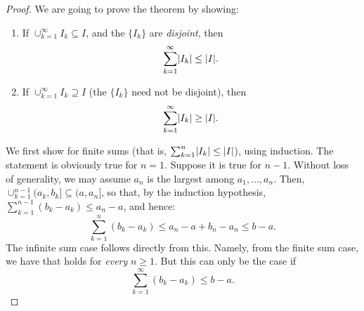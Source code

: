 \begin{proof}
	We are going to prove the theorem by showing:
	\begin{enumerate}
		\item If \(\cup_{k=1}^\infty I_k \subseteq I\), and the \(\{I_k\}\) are \textit{disjoint}, then
		      \begin{equation}
			      \sum_{k=1}^\infty \lvert I_k\rvert \le \lvert I\rvert.
			      \label{eq:IntervalSub}
		      \end{equation}
		\item If \(\cup_{k=1}^\infty I_k \supseteq I\) (the \(\{I_k\}\) need not be disjoint), then
		      \begin{equation}
			      \sum_{k=1}^\infty \lvert I_k\rvert \ge \lvert I\rvert.
			      \label{eq:IntervalSuper}
		      \end{equation}
	\end{enumerate}

	We first show  for finite sums (that is, \(\sum_{k=1}^n \lvert I_k\rvert \le \lvert I\rvert\)), using induction. The statement is obviously true for \(n=1\). Suppose it is true for \(n-1\). Without loss of generality, we may assume \(a_n\) is the largest among \(a_1, \dots, a_n\). Then, \(\cup_{k=1}^{n-1} \lparen a_k, b_k \rbrack \subseteq \lparen a, a_n \rbrack\), so that, by the induction hypothesis, \(\sum_{k=1}^{n-1} (b_k - a_k) \le a_n - a\), and hence:
	\begin{equation}
		\sum_{k=1}^n (b_k - a_k) \le a_n - a + b_n - a_n \le b - a.
		\label{eq:FiniteSumBound}
	\end{equation}
	The infinite sum case follows directly from this. Namely, from the finite sum case, we have that  holds for \textit{every} \(n \ge 1\). But this can only be the case if
	\begin{equation*}
		\sum_{k=1}^\infty (b_k - a_k) \le b - a.
	\end{equation*}


\end{proof}
